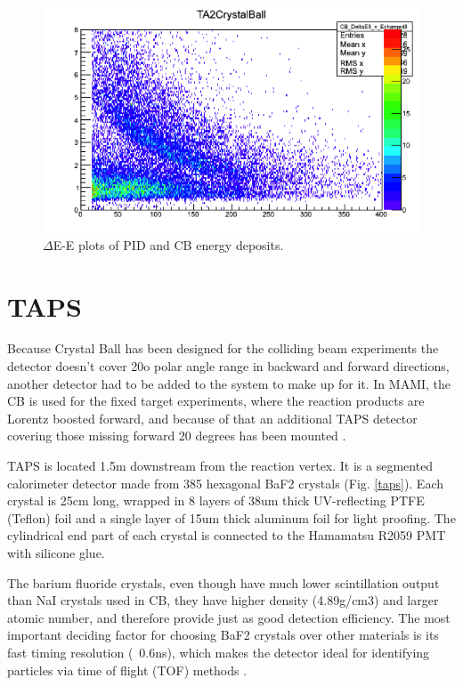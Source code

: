 \begin{figure}[H]
\begin{center}
\includegraphics[scale=0.8]{banana.png}
\caption{$\Delta$E-E plots of PID and CB energy deposits.}
\label{banana}
\end{center}
\end{figure}

\section{TAPS}

\indent Because Crystal Ball has been designed for the colliding beam experiments the detector  doesn’t  cover  20o  polar  angle  range  in  backward  and  forward directions, another detector had to be added to the system to make up for it. In MAMI,  the  CB  is  used  for  the  fixed  target  experiments,  where  the  reaction products are Lorentz boosted forward, and because of that an additional TAPS detector  covering  those  missing  forward  20  degrees has  been  mounted \cite{novotny}.

\indent TAPS is located 1.5m downstream from the reaction vertex. It is a segmented calorimeter detector made from 385 hexagonal BaF2 crystals (Fig. \ref{taps}). Each crystal is  25cm long,  wrapped in  8  layers  of 38um thick  UV-reflecting PTFE (Teflon) foil and a single layer of 15um thick aluminum foil for light proofing. The cylindrical end part of each crystal is connected to the Hamamatsu R2059 PMT with silicone glue.

\indent The barium fluoride crystals, even though have much lower scintillation output than NaI crystals used in CB, they have higher density (4.89g/cm3) and larger atomic number, and therefore provide just as good detection efficiency. The most important deciding factor for choosing BaF2 crystals over other materials is its fast timing resolution (~0.6ns), which makes the detector ideal for identifying particles via time of flight (TOF) methods \cite{novotny}.


